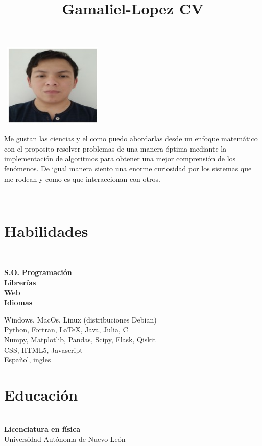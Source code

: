 \documentclass[a3paper]{adcv_color}
\title{Gamaliel-Lopez CV}
\begin{document}
\changefontsizes{17.5pt}
\begin{minipage}{0.17\linewidth}
  \includegraphics[width=5cm,height=4cm,angle=90]{photo.jpg}
\end{minipage}
\begin{minipage}{0.82\linewidth}
  Me gustan las ciencias y el como puedo abordarlas desde un enfoque matemático con el proposito resolver problemas de una manera óptima mediante la implementación de algoritmos para obtener una mejor comprensión de los fenómenos. De igual manera siento una enorme curiosidad por los sistemas que me rodean y como es que interaccionan con otros.
\end{minipage}\\

\begin{minipage}{0.7\linewidth}
  \section{Habilidades}\\

  \begin{minipage}{0.22\linewidth}
    \begin{flushleft}
      \textbf{S.O.}
      \textbf{Programación}\\
      \textbf{Librerías}\\
      \textbf{Web}\\
      \textbf{Idiomas}
    \end{flushleft}
  \end{minipage}
  \begin{minipage}{0.78\linewidth}
    \begin{flushleft}
      Windows, MacOs, Linux (distribuciones Debian)\\
      Python, Fortran, LaTeX, Java, Julia, C\\
      Numpy, Matplotlib, Pandas, Scipy, Flask, Qiskit\\
      CSS, HTML5, Javascript\\
      Español, ingles
    \end{flushleft}
  \end{minipage}
\end{minipage}
\begin{minipage}{0.29\linewidth}
  \vspace{-1.4cm}
  \section{Educación}\\

  \textbf{Licenciatura en física}\\
  Universidad Autónoma de Nuevo León
\end{minipage}\\
\end{document}
